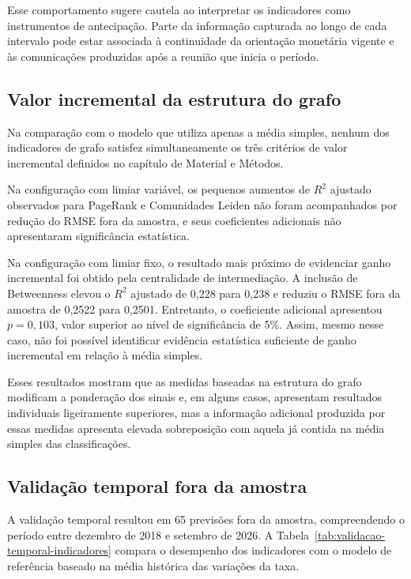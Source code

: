 Esse comportamento sugere cautela ao interpretar os indicadores como instrumentos
de antecipação. Parte da informação capturada ao longo de cada intervalo pode estar
associada à continuidade da orientação monetária vigente e às comunicações
produzidas após a reunião que inicia o período.

\subsection{Valor incremental da estrutura do grafo}

Na comparação com o modelo que utiliza apenas a média simples, nenhum dos
indicadores de grafo satisfez simultaneamente os três critérios de valor
incremental definidos no capítulo de Material e Métodos.

Na configuração com limiar variável, os pequenos aumentos de $R^2$ ajustado
observados para PageRank e Comunidades Leiden não foram acompanhados por redução
do RMSE fora da amostra, e seus coeficientes adicionais não apresentaram
significância estatística.

Na configuração com limiar fixo, o resultado mais próximo de evidenciar ganho
incremental foi obtido pela centralidade de intermediação. A inclusão de
Betweenness elevou o $R^2$ ajustado de 0,228 para 0,238 e reduziu o RMSE fora da
amostra de 0,2522 para 0,2501. Entretanto, o coeficiente adicional apresentou
$p=0,103$, valor superior ao nível de significância de 5\%. Assim, mesmo nesse
caso, não foi possível identificar evidência estatística suficiente de ganho
incremental em relação à média simples.

Esses resultados mostram que as medidas baseadas na estrutura do grafo modificam
a ponderação dos sinais e, em alguns casos, apresentam resultados individuais
ligeiramente superiores, mas a informação adicional produzida por essas medidas
apresenta elevada sobreposição com aquela já contida na média simples das
classificações.

\subsection{Validação temporal fora da amostra}

A validação temporal resultou em 65 previsões fora da amostra, compreendendo o
período entre dezembro de 2018 e setembro de 2026. A
Tabela~\ref{tab:validacao-temporal-indicadores} compara o desempenho dos
indicadores com o modelo de referência baseado na média histórica das variações
da taxa.

